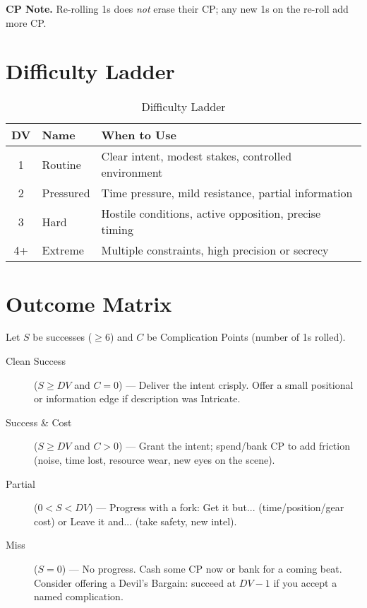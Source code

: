 \noindent\textbf{CP Note.} Re-rolling 1s does \emph{not} erase their CP; any new 1s on the re-roll add more CP.

\section{Difficulty Ladder}

\begin{table}[htbp]
\centering
\begin{tabular}{cll}
\toprule
\textbf{DV} & \textbf{Name} & \textbf{When to Use} \\
\midrule
1 & Routine & Clear intent, modest stakes, controlled environment \\
2 & Pressured & Time pressure, mild resistance, partial information \\
3 & Hard & Hostile conditions, active opposition, precise timing \\
4+ & Extreme & Multiple constraints, high precision or secrecy \\
\bottomrule
\end{tabular}
\caption{Difficulty Ladder}
\end{table}

\section{Outcome Matrix}

Let $S$ be successes ($\geq 6$) and $C$ be Complication Points (number of 1s rolled).

\begin{description}
\item[Clean Success] ($S \geq DV$ and $C = 0$) --- Deliver the intent crisply. Offer a small positional or information edge if description was Intricate.
\item[Success \& Cost] ($S \geq DV$ and $C > 0$) --- Grant the intent; spend/bank CP to add friction (noise, time lost, resource wear, new eyes on the scene).
\item[Partial] ($0 < S < DV$) --- Progress with a fork: Get it but... (time/position/gear cost) or Leave it and... (take safety, new intel).
\item[Miss] ($S = 0$) --- No progress. Cash some CP now or bank for a coming beat. Consider offering a Devil's Bargain: succeed at $DV-1$ if you accept a named complication.
\end{description}

